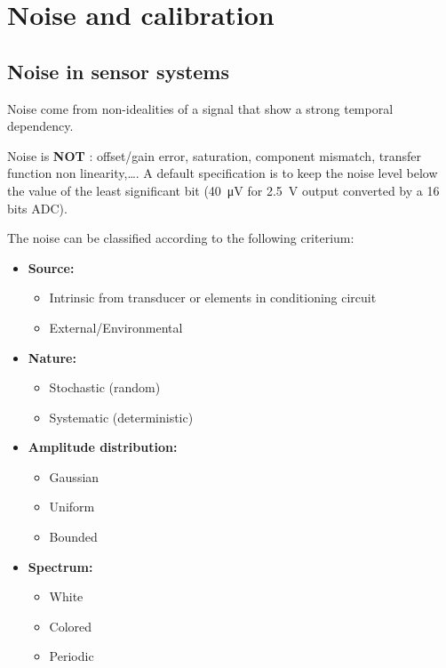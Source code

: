 \section{Noise and calibration}

\subsection{Noise in sensor systems}

Noise come from non-idealities of a signal that show
a strong temporal dependency.

Noise is \textbf{NOT} :
offset/gain error, saturation, component mismatch,
transfer function non linearity,\dots. A default specification is to keep the noise level below the value of the least significant bit (\SI{40}{\micro V} for \SI{2.5}{V} output converted by a 16 bits ADC).

The noise can be classified according to the following criterium:

\begin{itemize}
    \item \textbf{Source:} 
        \begin{itemize}
            \item Intrinsic from transducer or elements in conditioning circuit
            \item External/Environmental
        \end{itemize}
    \item \textbf{Nature:}
        \begin{itemize}
            \item Stochastic (random)
            \item Systematic (deterministic)
        \end{itemize}
    \item \textbf{Amplitude distribution:} 
        \begin{itemize}
            \item Gaussian
            \item Uniform
            \item Bounded
        \end{itemize}
    \item \textbf{Spectrum:}
        \begin{itemize}
            \item White
            \item Colored
            \item Periodic
        \end{itemize}
\end{itemize}


